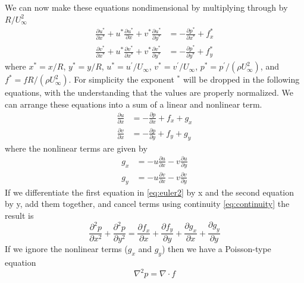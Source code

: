 \documentclass{article}
\begin{document}
We can now make these equations nondimensional by multiplying through by $R/U_\infty^2$
\begin{equation}
\begin{aligned}
\frac{\partial u^*}{\partial x^*} + u^* \frac{\partial u^*}{\partial x} + v^* \frac{\partial u^*}{\partial y^*} &= -\frac{\partial p^*}{\partial x^*} + f_x^*\\
\frac{\partial v^*}{\partial x^*} + u^* \frac{\partial v^*}{\partial x^*} + v^* \frac{\partial v^*}{\partial y^*} &= -\frac{\partial p^*}{\partial y^*} + f_y^*
\label{eq:normalized}
\end{aligned}
\end{equation}
where $x^* = x/R$, $y^* = y/R$, $u^* = u^\prime/U_\infty$, $v^* = v^\prime/U_\infty$, $p^* = p^\prime/(\rho U_\infty^2)$, and $f^* = f R / (\rho U_\infty^2)$.  For simplicity the exponent $^*$ will be dropped in the following equations, with the understanding that the values are properly normalized.  We can arrange these equations into a sum of a linear and nonlinear term.
\begin{equation}
\begin{aligned}
\frac{\partial u}{\partial x}  &= -\frac{\partial p}{\partial x} +f_x +  g_x\\
\frac{\partial v}{\partial x} &= -\frac{\partial p}{\partial y} + f_y + g_y
\label{eq:euler2}
\end{aligned}
\end{equation}
where the nonlinear terms are given by
\begin{equation}
\begin{aligned}
g_x &= -u \frac{\partial u}{\partial x} - v \frac{\partial u}{\partial y}\\
g_y &= -u \frac{\partial v}{\partial x} - v \frac{\partial v}{\partial y}
\end{aligned}
\end{equation}
If we differentiate the first equation in \eqref{eq:euler2} by x and the second equation by y, add them together, and cancel terms using continuity \eqref{eq:continuity} the result is
\begin{equation}
\frac{\partial^2 p}{\partial x^2} + \frac{\partial^2 p}{\partial y^2} = \frac{\partial f_x}{\partial x} + \frac{\partial f_y}{\partial y} + \frac{\partial g_x}{\partial x} + \frac{\partial g_y}{\partial y}
\end{equation}
If we ignore the nonlinear terms ($g_x$ and $g_y$) then we have a Poisson-type equation
\begin{equation}
\nabla^2 p = \nabla \cdot f
\end{equation}
\end{document}
